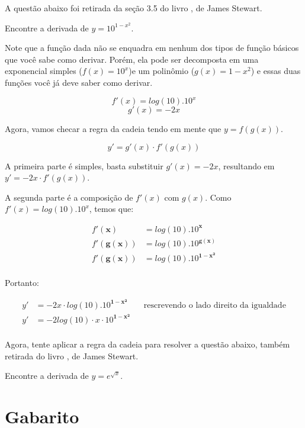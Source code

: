 \documentclass[main.tex]{subfiles}
\begin{document}
A questão abaixo foi retirada da seção 3.5 do livro , de James Stewart.

\begin{resolvida}
Encontre a derivada de $y=10^{1-x^2}$.
\end{resolvida}

Note que a função dada não se enquadra em nenhum dos tipos de função básicos que você sabe como derivar. Porém, ela pode ser decomposta em uma exponencial simples ($f(x)=10^x$)e um polinômio ($g(x)=1-x^2$) e essas duas funções você já deve saber como derivar.

$$f'(x)=log(10) . 10^x $$
$$g'(x)=-2x $$

Agora, vamos checar a regra da cadeia tendo em mente que $y=f(g(x))$.

$$y' = g'(x) \cdot f'(g(x))$$

A primeira parte é simples, basta substituir $g'(x)=-2x$, resultando em $y' = -2x \cdot f'(g(x))$.

A segunda parte é a composição de $f'(x)$ com $g(x)$. Como $f'(x)=log(10) . 10^x$, temos que:

\begin{align*}
 f'(\mathbf{x}) &= log(10) . 10^\mathbf{x} \\
 f'(\mathbf{g(x)}) &= log(10) . 10^\mathbf{g(x)} \\
 f'(\mathbf{g(x)}) &= log(10) . 10^\mathbf{1-x^2} \\
\end{align*}

Portanto:

\begin{align*}
y' &= -2x \cdot log(10) . 10^\mathbf{1-x^2} && \text{rescrevendo o lado direito da igualdade} \\
y' &= -2log(10) \cdot x \cdot 10^\mathbf{1-x^2} \\
\end{align*}

Agora, tente aplicar a regra da cadeia para resolver a questão abaixo, também retirada do livro , de James Stewart.

\begin{resolva}
Encontre a derivada de $y=e^{\sqrt{x}}$.
\end{resolva}

\section{Gabarito}
\end{document}
